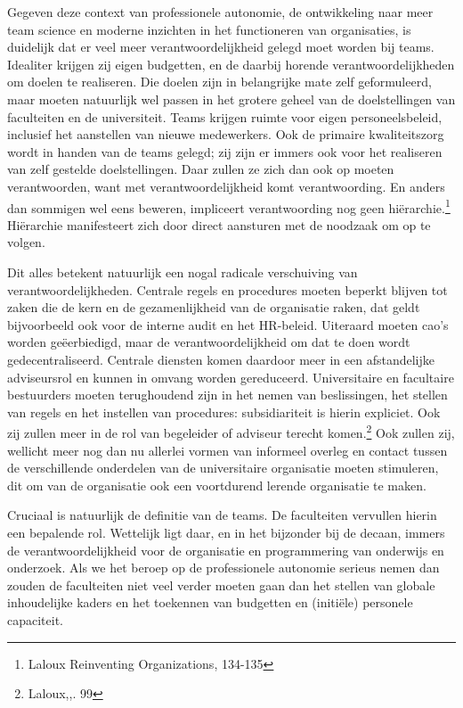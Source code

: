 \documentclass[empirical, authordate, ]{new-jote-article}
\begin{document}
	Gegeven deze context van professionele autonomie, de ontwikkeling naar meer team science en moderne inzichten in het functioneren van organisaties, is duidelijk dat er veel meer verantwoordelijkheid gelegd moet worden bij teams. Idealiter krijgen zij eigen budgetten, en de daarbij horende verantwoordelijkheden om doelen te realiseren. Die doelen zijn in belangrijke mate zelf geformuleerd, maar moeten natuurlijk wel passen in het grotere geheel van de doelstellingen van faculteiten en de universiteit. Teams krijgen ruimte voor eigen personeelsbeleid, inclusief het aanstellen van nieuwe medewerkers. Ook de primaire kwaliteitszorg wordt in handen van de teams gelegd; zij zijn er immers ook voor het realiseren van zelf gestelde doelstellingen. Daar zullen ze zich dan ook op moeten verantwoorden, want met verantwoordelijkheid komt verantwoording. En anders dan sommigen wel eens beweren, impliceert verantwoording nog geen hiërarchie.\footnote{Laloux Reinventing Organizations, 134-135} Hiërarchie manifesteert zich door direct aansturen met de noodzaak om op te volgen.



	Dit alles betekent natuurlijk een nogal radicale verschuiving van verantwoordelijkheden. Centrale regels en procedures moeten beperkt blijven tot zaken die de kern en de gezamenlijkheid van de organisatie raken, dat geldt bijvoorbeeld ook voor de interne audit en het HR-beleid. Uiteraard moeten cao's worden geëerbiedigd, maar de verantwoordelijkheid om dat te doen wordt gedecentraliseerd. Centrale diensten komen daardoor meer in een afstandelijke adviseursrol en kunnen in omvang worden gereduceerd. Universitaire en facultaire bestuurders moeten terughoudend zijn in het nemen van beslissingen, het stellen van regels en het instellen van procedures: subsidiariteit is hierin expliciet. Ook zij zullen meer in de rol van begeleider of adviseur terecht komen.\footnote{Laloux,,. 99} Ook zullen zij, wellicht meer nog dan nu allerlei vormen van informeel overleg en contact tussen de verschillende onderdelen van de universitaire organisatie moeten stimuleren, dit om van de organisatie ook een voortdurend lerende organisatie te maken.



	Cruciaal is natuurlijk de definitie van de teams. De faculteiten vervullen hierin een bepalende rol. Wettelijk ligt daar, en in het bijzonder bij de decaan, immers de verantwoordelijkheid voor de organisatie en programmering van onderwijs en onderzoek. Als we het beroep op de professionele autonomie serieus nemen dan zouden de faculteiten niet veel verder moeten gaan dan het stellen van globale inhoudelijke kaders en het toekennen van budgetten en (initiële) personele capaciteit.
\end{document}
